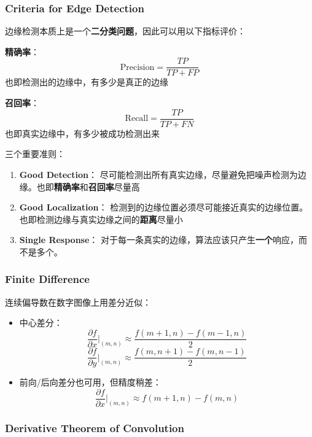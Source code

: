 \subsubsection{Criteria for Edge
  Detection}\label{criteria-for-edge-detection}

边缘检测本质上是一个\textbf{二分类问题}，因此可以用以下指标评价：

\textbf{精确率}： \[
  \text{Precision} = \frac{TP}{TP + FP}
\] 也即检测出的边缘中，有多少是真正的边缘

\textbf{召回率}： \[
  \text{Recall} = \frac{TP}{TP + FN}
\] 也即真实边缘中，有多少被成功检测出来

三个重要准则：

\begin{enumerate}
  \def\labelenumi{\arabic{enumi}.}
  \tightlist
  \item
        \textbf{Good Detection}：
        尽可能检测出所有真实边缘，尽量避免把噪声检测为边缘。也即\textbf{精确率}和\textbf{召回率}尽量高
  \item
        \textbf{Good Localization}：
        检测到的边缘位置必须尽可能接近真实的边缘位置。也即检测边缘与真实边缘之间的\textbf{距离}尽量小
  \item
        \textbf{Single Response}：
        对于每一条真实的边缘，算法应该只产生\textbf{一个}响应，而不是多个。
\end{enumerate}

\subsubsection{Finite Difference}\label{finite-difference}

连续偏导数在数字图像上用差分近似：

\begin{itemize}
  \tightlist
  \item
        中心差分： \[
          \frac{\partial f}{\partial x}\bigg|_{(m,n)} \approx \frac{f(m+1, n)   - f(m-1,n)}{2}
        \] \[
          \frac{\partial f}{\partial y}\bigg|_{(m,n)} \approx \frac{f(m, n+1)   - f(m,n-1)}{2}
        \]
  \item
        前向/后向差分也可用，但精度稍差： \[
          \frac{\partial f}{\partial x}\bigg|_{(m,n)} \approx f(m+1,n)   - f(m,n)
        \]
\end{itemize}

\subsubsection{Derivative Theorem of
  Convolution}\label{derivative-theorem-of-convolution}

